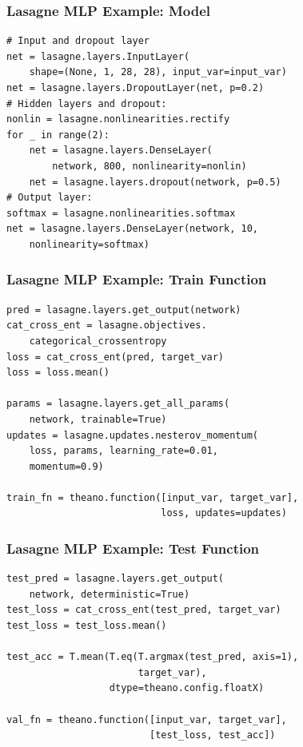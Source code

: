 \documentclass[utf8x,xcolor=pdftex,dvipsnames,table]{beamer}
\begin{document}
\begin{frame}[fragile]
  \frametitle{Lasagne MLP Example: Model}

\begin{lstlisting}
# Input and dropout layer
net = lasagne.layers.InputLayer(
    shape=(None, 1, 28, 28), input_var=input_var)
net = lasagne.layers.DropoutLayer(net, p=0.2)
# Hidden layers and dropout:
nonlin = lasagne.nonlinearities.rectify
for _ in range(2):
    net = lasagne.layers.DenseLayer(
        network, 800, nonlinearity=nonlin)
    net = lasagne.layers.dropout(network, p=0.5)
# Output layer:
softmax = lasagne.nonlinearities.softmax
net = lasagne.layers.DenseLayer(network, 10,
    nonlinearity=softmax)
\end{lstlisting}
\end{frame}

\begin{frame}[fragile]
  \frametitle{Lasagne MLP Example: Train Function}

\begin{lstlisting}
pred = lasagne.layers.get_output(network)
cat_cross_ent = lasagne.objectives.
    categorical_crossentropy
loss = cat_cross_ent(pred, target_var)
loss = loss.mean()

params = lasagne.layers.get_all_params(
    network, trainable=True)
updates = lasagne.updates.nesterov_momentum(
    loss, params, learning_rate=0.01,
    momentum=0.9)

train_fn = theano.function([input_var, target_var],
                           loss, updates=updates)
\end{lstlisting}
\end{frame}

\begin{frame}[fragile]
  \frametitle{Lasagne MLP Example: Test Function}

  \begin{lstlisting}
test_pred = lasagne.layers.get_output(
    network, deterministic=True)
test_loss = cat_cross_ent(test_pred, target_var)
test_loss = test_loss.mean()

test_acc = T.mean(T.eq(T.argmax(test_pred, axis=1),
                       target_var),
                  dtype=theano.config.floatX)

val_fn = theano.function([input_var, target_var],
                         [test_loss, test_acc])
\end{lstlisting}
\end{frame}
\end{document}
